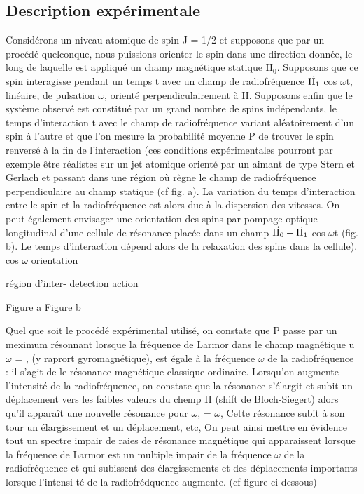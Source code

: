 \subsection{Description expérimentale}%
Considérons un niveau atomique de spin J = 1/2 et supposons que
par un procédé quelconque, nous puissions orienter le spin dans une direction donnée,
le long de laquelle est appliqué un champ magnétique statique
H$_0$. Supposons que ce spin interagisse pendant un temps t avec un champ de
radiofréquence $\vec{\text{H}}_1$ cos $\omega$t, linéaire, de pulsation $\omega$, orienté perpendiculairement
à H. Supposons enfin que le système observé est constitué par un
grand nombre de spins indépendants, le temps d'interaction t avec le champ
de radiofréquence variant aléatoirement d'un spin à l'autre et que l'on mesure
la probabilité moyenne P de trouver le spin renversé à la fin de l'interaction
(ces conditions expérimentales pourront par exemple être réalistes
sur un jet atomique orienté par un aimant de type Stern et Gerlach et passant
dans une région où règne le champ de radiofréquence perpendiculaire au champ
statique (cf fig. a). La variation du temps d'interaction entre le spin et
la radiofréquence est alors due à la dispersion des vitesses. On peut également envisager
une orientation des spins par pompage optique longitudinal
d'une cellule de résonance placée dans un champ $\vec{\text{H}}_0+\vec{\text{H}}_1$ cos $\omega$t (fig. b). Le
temps d'interaction dépend alors de la relaxation des spins dans la cellule).
cos $\omega$
orientation

région d'inter- detection
action

Figure a Figure b


 

Quel que soit le procédé expérimental utilisé, on constate que P
passe par un meximum résonnant lorsque la fréquence de Larmor dans le champ
magnétique  u$\omega$ = , (y raprort gyromagnétique), est égale à la fréquence
$\omega$ de la radiofréquence : il s'agit de le résonance magnétique classique ordinaire. 
Lorsqu'on augmente l'intensité de la radiofréquence, on constate que
la résonance  s'élargit et subit un déplacement vers les faibles valeurs du chemp H
(shift de Bloch-Siegert) alors qu'il apparaît une nouvelle
résonance pour $\omega$, = $\omega$, Cette résonance subit à son tour un élargissement et
un déplacement, etc, On peut ainsi mettre en évidence tout un spectre impair
de raies de résonance magnétique qui apparaissent lorsque la fréquence de
Larmor est un multiple impair de la fréquence $\omega$ de la radiofréquence et qui
subissent des élargissements et des déplacements importants lorsque l'intensi
té de la radiofrédquence augmente. (cf figure ci-dessous)

